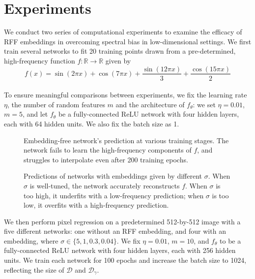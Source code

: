\documentclass[11pt]{article}
\newcommand{\R}{\mathbb{R}}
\begin{document}
\section{Experiments}
We conduct two series of computational experiments to examine the efficacy of RFF embeddings in overcoming spectral bias in low-dimensional settings. We first train several networks to fit 20 training points drawn from a pre-determined, high-frequency function $f:\R \rightarrow \R$ given by
$$f(x) = \sin(2\pi x) + \cos(7\pi x) + \frac{\sin(12\pi x)}{3} + \frac{\cos(15\pi x)}{2}$$\\
To ensure meaningful comparisons between experiments, we fix the learning rate $\eta$, the number of random features $m$ and the architecture of $f_\theta$: we set $\eta = 0.01$, $m = 5$, and let $f_\theta$ be a  fully-connected ReLU network with four hidden layers, each with 64 hidden units. We also fix the batch size as 1.\\
\begin{figure}[h]
\centering 
{} 
\caption{Embedding-free network's prediction at various training stages. The network fails to learn the high-frequency components of $f$, and struggles to interpolate even after 200 training epochs.} \label{fig:multiimage} 
\end{figure}
\begin{figure}[h]
\centering 
{} 
\caption{Predictions of networks with embeddings given by different $\sigma$. When $\sigma$ is well-tuned, the network accurately reconstructs $f$. When $\sigma$ is too high, it underfits with a low-frequency prediction; when $\sigma$ is too low, it overfits with a high-frequency prediction.} \label{fig:multiimage} 
\end{figure}

\noindent We then perform pixel regression on a predetermined 512-by-512 image with a five different networks: one without an RFF embedding, and four with an embedding, where $\sigma \in \{5, 1, 0.3, 0.04\}$. We fix $\eta = 0.01$, $m = 10$, and $f_\theta$ to be a fully-connected ReLU network with four hidden layers, each with 256 hidden units. We train each network for 100 epochs and increase the batch size to 1024, reflecting the size of $\mathcal{D}$ and $\mathcal{D}_\gamma$. 
\end{document}
